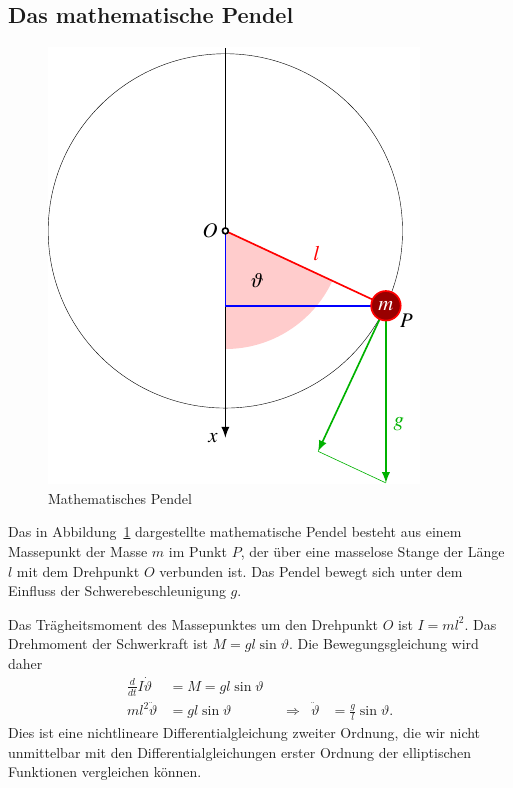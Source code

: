 %
%
%

\subsection{Das mathematische Pendel
\label{buch:elliptisch:subsection:mathpendel}}
\begin{figure}
\centering
\includegraphics{chapters/110-elliptisch/images/pendel.pdf}
\caption{Mathematisches Pendel
\label{buch:elliptisch:fig:mathpendel}}
\end{figure}
Das in Abbildung~\ref{buch:elliptisch:fig:mathpendel} dargestellte
mathematische Pendel besteht aus einem Massepunkt der Masse $m$
im Punkt $P$,
der über eine masselose Stange der Länge $l$ mit dem Drehpunkt $O$
verbunden ist.
Das Pendel bewegt sich unter dem Einfluss der Schwerebeschleunigung $g$.

Das Trägheitsmoment des Massepunktes um den Drehpunkt $O$ ist
\(
I=ml^2
\).
Das Drehmoment der Schwerkraft ist
\(M=gl\sin\vartheta\).
Die Bewegungsgleichung wird daher
\[
\begin{aligned}
\frac{d}{dt} I\dot{\vartheta}
&=
M
=
gl\sin\vartheta
\\
ml^2\ddot{\vartheta}
&=
gl\sin\vartheta
&&\Rightarrow&
\ddot{\vartheta}
&=\frac{g}{l}\sin\vartheta.
\end{aligned}
\]
Dies ist eine nichtlineare Differentialgleichung zweiter Ordnung, die
wir nicht unmittelbar mit den Differentialgleichungen erster Ordnung
der elliptischen Funktionen vergleichen können.

